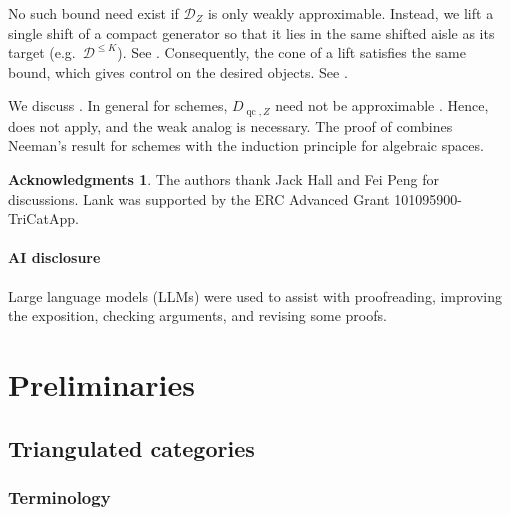 \documentclass[11pt]{amsart}
\theoremstyle{plain}
\theoremstyle{definition}
\newtheorem*{ack}{Acknowledgments}
\numberwithin{equation}{section}
\numberwithin{theorem}{section}
\begin{document}
No such bound need exist if $\mathcal{D}_Z$ is only weakly approximable.
Instead, we lift a single shift of a compact generator so that it lies in the same shifted aisle as its target (e.g.\ $\mathcal{D}^{\leq K}$).
See .
Consequently, the cone of a lift satisfies the same bound, which gives control on the desired objects.
See .

We discuss .
In general for schemes, $D_{\operatorname{qc},Z}$ need not be approximable \cite[Remark 8.1]{Neeman:2024}.
Hence, \cite[Theorem 5.1]{Burke/Neeman/Pauwels:2023} does not apply, and the weak analog is necessary.
The proof of  combines Neeman's result for schemes \cite[Theorem 3.2(iv)]{Neeman:2024} with the induction principle for algebraic spaces.

\begin{ack}
    The authors thank Jack Hall and Fei Peng for discussions. 
    Lank was supported by the ERC Advanced Grant 101095900-TriCatApp.
\end{ack}

\paragraph*{\textbf{AI disclosure}}

Large language models (LLMs) were used to assist with proofreading, improving the exposition, checking arguments, and revising some proofs.

\section{Preliminaries}
\label{sec:prelim}

\subsection{Triangulated categories}
\label{sec:prelim_triangulated}

\subsubsection{Terminology}
\label{sec:prelim_terminology}
\end{document}
